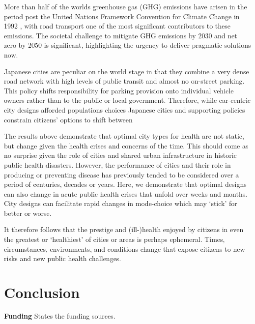 \documentclass[preprint,12pt]{elsarticle}
\begin{document}
More than half of the worlds greenhouse gas (GHG) emissions have arisen in the period post the United Nations Framework Convention for Climate Change in 1992 \cite{bashmakov2022climate}, with road transport one of the most significant contributors to these emissions. The societal challenge to mitigate GHG emissions by 2030 and net zero by 2050 \cite{lynskey2020moving} is significant, highlighting the urgency to deliver pragmatic solutions now.

Japanese cities are peculiar on the world stage in that they combine a very dense road network with high levels of public transit and almost no on-street parking. This policy shifts responsibility for parking provision onto individual vehicle owners rather than to the public or local government. Therefore, while car-centric city designs afforded populations choices Japanese cities and supporting policies constrain citizens' options to shift between 

The results above demonstrate that optimal city types for health are not static, but change given the health crises and concerns of the time. This should come as no surprise given the role of cities and shared urban infrastructure in historic public health disasters. However, the performance of cities and their role in producing or preventing disease has previously tended to be considered over a period of centuries, decades or years. Here, we demonstrate that optimal designs can also change in acute public health crises that unfold over weeks and months. City designs can facilitate rapid changes in mode-choice which may `stick' for better or worse. 

It therefore follows that the prestige and (ill-)health enjoyed by citizens in even the greatest or `healthiest' of cities or areas is perhaps ephemeral. Times, circumstances, environments, and conditions change that expose citizens to new risks and new public health challenges.


\section*{Conclusion}

\textbf{Funding} States the funding sources.
\end{document}

